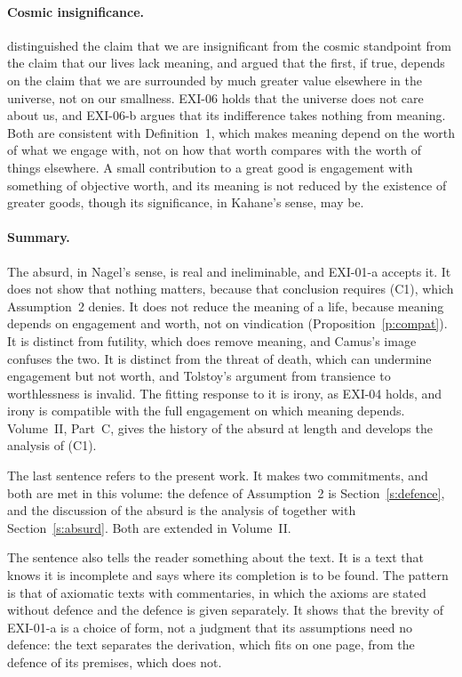 \paragraph{Cosmic insignificance.} \citet{Kahane2014} distinguished the claim that we are insignificant from the cosmic standpoint from the claim that our lives lack meaning, and argued that the first, if true, depends on the claim that we are surrounded by much greater value elsewhere in the universe, not on our smallness. EXI-06 holds that the universe does not care about us, and EXI-06-b argues that its indifference takes nothing from meaning. Both are consistent with Definition~1, which makes meaning depend on the worth of what we engage with, not on how that worth compares with the worth of things elsewhere. A small contribution to a great good is engagement with something of objective worth, and its meaning is not reduced by the existence of greater goods, though its significance, in Kahane's sense, may be.

\paragraph{Summary.} The absurd, in Nagel's sense, is real and ineliminable, and EXI-01-a accepts it. It does not show that nothing matters, because that conclusion requires (C1), which Assumption~2 denies. It does not reduce the meaning of a life, because meaning depends on engagement and worth, not on vindication (Proposition~\ref{p:compat}). It is distinct from futility, which does remove meaning, and Camus's image confuses the two. It is distinct from the threat of death, which can undermine engagement but not worth, and Tolstoy's argument from transience to worthlessness is invalid. The fitting response to it is irony, as EXI-04 holds, and irony is compatible with the full engagement on which meaning depends. Volume~II, Part~C, gives the history of the absurd at length and develops the analysis of (C1).


The last sentence refers to the present work. It makes two commitments, and both are met in this volume: the defence of Assumption~2 is Section~\ref{s:defence}, and the discussion of the absurd is the analysis of  together with Section~\ref{s:absurd}. Both are extended in Volume~II.

The sentence also tells the reader something about the text. It is a text that knows it is incomplete and says where its completion is to be found. The pattern is that of axiomatic texts with commentaries, in which the axioms are stated without defence and the defence is given separately. It shows that the brevity of EXI-01-a is a choice of form, not a judgment that its assumptions need no defence: the text separates the derivation, which fits on one page, from the defence of its premises, which does not.
